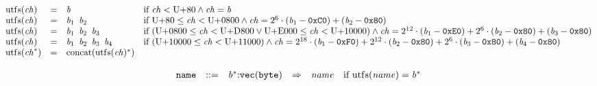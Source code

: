 \vspace{1ex}

$$
\begin{array}{@{}lcl@{}l@{}}
{\mathrm{utf{\scriptstyle8}}}({\mathit{ch}}) &=& {\mathit{b}} &\quad
  \mbox{if}~{\mathit{ch}} < \mathrm{U{+}80} \land {\mathit{ch}} = {\mathit{b}} \\
{\mathrm{utf{\scriptstyle8}}}({\mathit{ch}}) &=& {\mathit{b}}_{{1}}~\,{\mathit{b}}_{{2}} &\quad
  \mbox{if}~\mathrm{U{+}80} \leq {\mathit{ch}} < \mathrm{U{+}0800} \land {\mathit{ch}} = {2^{6}} \cdot ({\mathit{b}}_{{1}} - \mathtt{0xC0}) + ({\mathit{b}}_{{2}} - \mathtt{0x80}) \\
{\mathrm{utf{\scriptstyle8}}}({\mathit{ch}}) &=& {\mathit{b}}_{{1}}~\,{\mathit{b}}_{{2}}~\,{\mathit{b}}_{{3}} &\quad
  \mbox{if}~(\mathrm{U{+}0800} \leq {\mathit{ch}} < \mathrm{U{+}D800} \lor \mathrm{U{+}E000} \leq {\mathit{ch}} < \mathrm{U{+}10000}) \land {\mathit{ch}} = {2^{12}} \cdot ({\mathit{b}}_{{1}} - \mathtt{0xE0}) + {2^{6}} \cdot ({\mathit{b}}_{{2}} - \mathtt{0x80}) + ({\mathit{b}}_{{3}} - \mathtt{0x80}) \\
{\mathrm{utf{\scriptstyle8}}}({\mathit{ch}}) &=& {\mathit{b}}_{{1}}~\,{\mathit{b}}_{{2}}~\,{\mathit{b}}_{{3}}~\,{\mathit{b}}_{{4}} &\quad
  \mbox{if}~(\mathrm{U{+}10000} \leq {\mathit{ch}} < \mathrm{U{+}11000}) \land {\mathit{ch}} = {2^{18}} \cdot ({\mathit{b}}_{{1}} - \mathtt{0xF0}) + {2^{12}} \cdot ({\mathit{b}}_{{2}} - \mathtt{0x80}) + {2^{6}} \cdot ({\mathit{b}}_{{3}} - \mathtt{0x80}) + ({\mathit{b}}_{{4}} - \mathtt{0x80}) \\
{\mathrm{utf{\scriptstyle8}}}({{\mathit{ch}}^\ast}) &=& {\mathrm{concat}}({{\mathrm{utf{\scriptstyle8}}}({\mathit{ch}})^\ast}) &  \\
\end{array}
$$

$$
\begin{array}{@{}l@{}rrlll@{}l@{}}
& {\mathtt{name}} &::=& {{\mathit{b}}^\ast}{:}{\mathtt{vec}}({\mathtt{byte}}) &\Rightarrow& {\mathit{name}} &\quad
  \mbox{if}~{\mathrm{utf{\scriptstyle8}}}({\mathit{name}}) = {{\mathit{b}}^\ast} \\
\end{array}
$$

\vspace{1ex}

